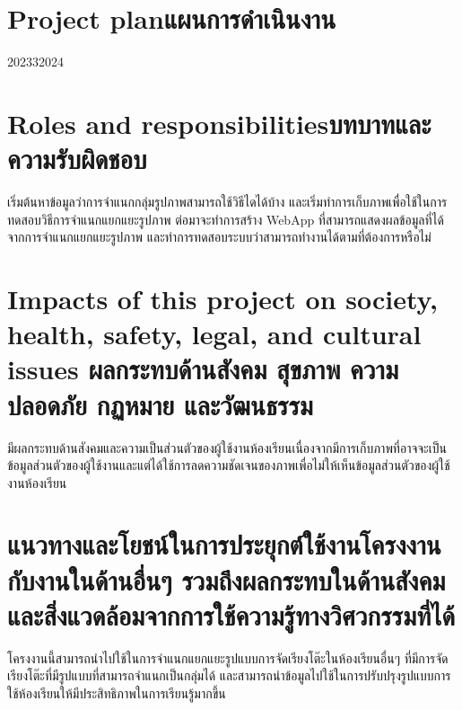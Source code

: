 \section{\ifenglish Project plan\else แผนการดำเนินงาน\fi}

\begin{plan}{6}{2023}{3}{2024}
\end{plan}

\section{\ifenglish Roles and responsibilities\else บทบาทและความรับผิดชอบ\fi}
เริ่มต้นหาข้อมูลว่าการจำแนกกลุ่มรูปภาพสามารถใช้วิธีไดได้บ้าง และเริ่มทำการเก็บภาพเพื่อใช้ในการทดสอบวิธีการจำแนกแยกแยะรูปภาพ
\enskip ต่อมาจะทำการสร้าง WebApp ที่สามารถแสดงผลข้อมูลที่ได้จากการจำแนกแยกแยะรูปภาพ และทำการทดสอบระบบว่าสามารถทำงานได้ตามที่ต้องการหรือไม่

\section{\ifenglish%
Impacts of this project on society, health, safety, legal, and cultural issues
\else%
ผลกระทบด้านสังคม สุขภาพ ความปลอดภัย กฏหมาย และวัฒนธรรม
\fi}
มีผลกระทบด้านสังคมและความเป็นส่วนตัวของผู้ใช้งานห้องเรียนเนื่องจากมีการเก็บภาพที่อาจจะเป็นข้อมูลส่วนตัวของผู้ใช้งานและแต่ได้ใช้การลดความชัดเจนของภาพเพื่อไม่ให้เห็นข้อมูลส่วนตัวของผู้ใช้งานห้องเรียน
\section{แนวทางและโยชน์ในการประยุกต์ใช้งานโครงงานกับงานในด้านอื่นๆ รวมถึงผลกระทบในด้านสังคมและสิ่งแวดล้อมจากการใช้ความรู้ทางวิศวกรรมที่ได้}
โครงงานนี้สามารถนำไปใช้ในการจำแนกแยกแยะรูปแบบการจัดเรียงโต๊ะในห้องเรียนอื่นๆ ที่มีการจัดเรียงโต๊ะที่มีรูปแบบที่สามารถจำแนกเป็นกลุ่มได้
\enskip และสามารถนำข้อมูลไปใช้ในการปรับปรุงรูปแบบการใช้ห้องเรียนให้มีประสิทธิภาพในการเรียนรู้มากขึ้น
